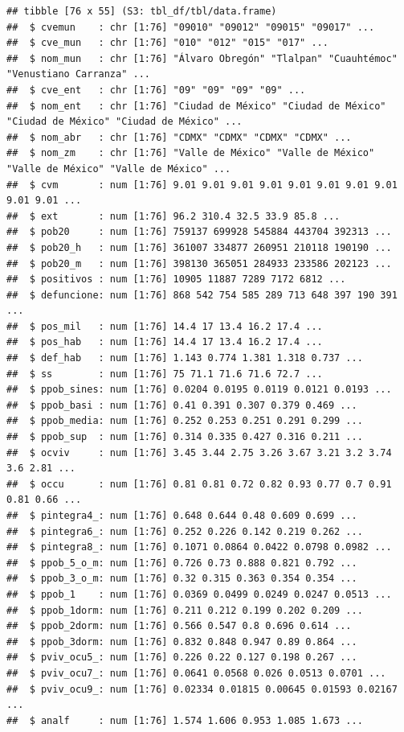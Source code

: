 \documentclass[
  11pt,
  oneside]{book}
\begin{document}
\begin{verbatim}
## tibble [76 x 55] (S3: tbl_df/tbl/data.frame)
##  $ cvemun    : chr [1:76] "09010" "09012" "09015" "09017" ...
##  $ cve_mun   : chr [1:76] "010" "012" "015" "017" ...
##  $ nom_mun   : chr [1:76] "Álvaro Obregón" "Tlalpan" "Cuauhtémoc" "Venustiano Carranza" ...
##  $ cve_ent   : chr [1:76] "09" "09" "09" "09" ...
##  $ nom_ent   : chr [1:76] "Ciudad de México" "Ciudad de México" "Ciudad de México" "Ciudad de México" ...
##  $ nom_abr   : chr [1:76] "CDMX" "CDMX" "CDMX" "CDMX" ...
##  $ nom_zm    : chr [1:76] "Valle de México" "Valle de México" "Valle de México" "Valle de México" ...
##  $ cvm       : num [1:76] 9.01 9.01 9.01 9.01 9.01 9.01 9.01 9.01 9.01 9.01 ...
##  $ ext       : num [1:76] 96.2 310.4 32.5 33.9 85.8 ...
##  $ pob20     : num [1:76] 759137 699928 545884 443704 392313 ...
##  $ pob20_h   : num [1:76] 361007 334877 260951 210118 190190 ...
##  $ pob20_m   : num [1:76] 398130 365051 284933 233586 202123 ...
##  $ positivos : num [1:76] 10905 11887 7289 7172 6812 ...
##  $ defuncione: num [1:76] 868 542 754 585 289 713 648 397 190 391 ...
##  $ pos_mil   : num [1:76] 14.4 17 13.4 16.2 17.4 ...
##  $ pos_hab   : num [1:76] 14.4 17 13.4 16.2 17.4 ...
##  $ def_hab   : num [1:76] 1.143 0.774 1.381 1.318 0.737 ...
##  $ ss        : num [1:76] 75 71.1 71.6 71.6 72.7 ...
##  $ ppob_sines: num [1:76] 0.0204 0.0195 0.0119 0.0121 0.0193 ...
##  $ ppob_basi : num [1:76] 0.41 0.391 0.307 0.379 0.469 ...
##  $ ppob_media: num [1:76] 0.252 0.253 0.251 0.291 0.299 ...
##  $ ppob_sup  : num [1:76] 0.314 0.335 0.427 0.316 0.211 ...
##  $ ocviv     : num [1:76] 3.45 3.44 2.75 3.26 3.67 3.21 3.2 3.74 3.6 2.81 ...
##  $ occu      : num [1:76] 0.81 0.81 0.72 0.82 0.93 0.77 0.7 0.91 0.81 0.66 ...
##  $ pintegra4_: num [1:76] 0.648 0.644 0.48 0.609 0.699 ...
##  $ pintegra6_: num [1:76] 0.252 0.226 0.142 0.219 0.262 ...
##  $ pintegra8_: num [1:76] 0.1071 0.0864 0.0422 0.0798 0.0982 ...
##  $ ppob_5_o_m: num [1:76] 0.726 0.73 0.888 0.821 0.792 ...
##  $ ppob_3_o_m: num [1:76] 0.32 0.315 0.363 0.354 0.354 ...
##  $ ppob_1    : num [1:76] 0.0369 0.0499 0.0249 0.0247 0.0513 ...
##  $ ppob_1dorm: num [1:76] 0.211 0.212 0.199 0.202 0.209 ...
##  $ ppob_2dorm: num [1:76] 0.566 0.547 0.8 0.696 0.614 ...
##  $ ppob_3dorm: num [1:76] 0.832 0.848 0.947 0.89 0.864 ...
##  $ pviv_ocu5_: num [1:76] 0.226 0.22 0.127 0.198 0.267 ...
##  $ pviv_ocu7_: num [1:76] 0.0641 0.0568 0.026 0.0513 0.0701 ...
##  $ pviv_ocu9_: num [1:76] 0.02334 0.01815 0.00645 0.01593 0.02167 ...
##  $ analf     : num [1:76] 1.574 1.606 0.953 1.085 1.673 ...

\end{verbatim}
\end{document}
